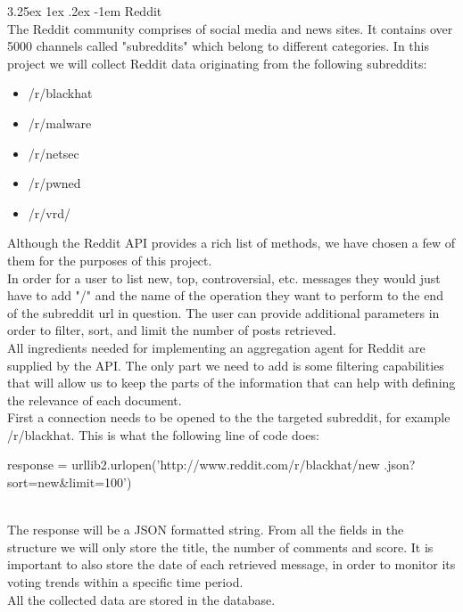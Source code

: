 \documentclass[12pt]{article}
\makeatletter
\renewcommand\paragraph{\@startsection{paragraph}{5}{\z@}%
  {3.25ex \@plus1ex \@minus.2ex}%
  {-1em}%
  {\normalfont\normalsize\bfseries}}
\makeatother
\begin{document}
\paragraph{Reddit}
\hfill \break
\\
The Reddit community comprises of social media and news sites. It contains over 5000 channels called "subreddits" which belong to different categories. In this project we will collect Reddit \cite{reddit} data originating from the following subreddits:
\begin{itemize}
\item /r/blackhat \cite{r.blackhat}
\item /r/malware \cite{r.malware}
\item /r/netsec \cite{r.netsec}
\item /r/pwned \cite{r.pwned}
\item /r/vrd/ \cite{r.rvd}
\end{itemize}
Although the Reddit API \cite{reddit} provides a rich list of methods, we have chosen a few of them for the purposes of this project.\\
\hfill \break
In order for a user to list new, top, controversial, etc. messages they would just have to add "/" and the name of the operation they want to perform to the end of the subreddit url in question. The user can provide additional parameters in order to filter, sort, and limit the number of posts retrieved. 
\hfill \break
\\
All ingredients needed for implementing an aggregation agent for Reddit are supplied by the API. The only part we need to add is some filtering capabilities that will allow us to keep the parts of the information that can help with defining the relevance of each document.
\hfill \break
\\
First a connection needs to be opened to the the targeted subreddit, for example /r/blackhat. This is what the following line of code does:

\begin{spverbatim}
response = urllib2.urlopen('http://www.reddit.com/r/blackhat/new
			.json?sort=new&limit=100')
\end{spverbatim}
\hfill \break
\\
The response will be a JSON formatted string. From all the fields in the structure we will only store the title, the number of comments and score. It is important to also store the date of each retrieved message, in order to monitor its voting trends within a specific time period.
\hfill \break
\\
All the collected data are stored in the database. 
\end{document}
